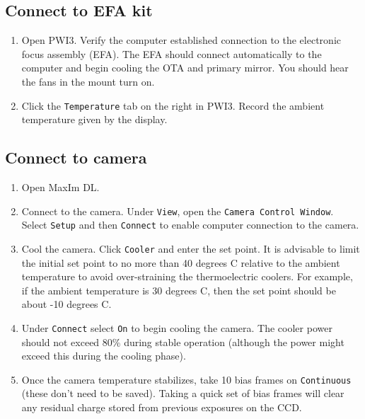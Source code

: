 \documentclass{article}
\begin{document}
	\subsection{Connect to EFA kit}
	\label{sec:connect-to-efa-kit}
	
	\begin{enumerate}
		
		\item Open PWI3. Verify the computer established connection to the electronic focus assembly (EFA). The EFA should connect automatically to the computer and begin cooling the OTA and primary mirror. You should hear the fans in the mount turn on.
		
		\item Click the \texttt{Temperature} tab on the right in PWI3. Record the ambient temperature given by the display.
		
	\end{enumerate}
	
	\subsection{Connect to camera}
	\label{sec:connect-to-camera}
	
	\begin{enumerate}
		
		\item Open MaxIm DL.
		
		\item Connect to the camera. Under \texttt{View}, open the \texttt{Camera Control Window}. Select \texttt{Setup} and then \texttt{Connect} to enable computer connection to the camera.
		
		\item Cool the camera. Click \texttt{Cooler} and enter the set point. It is advisable to limit the initial set point to no more than 40 degrees C relative to the ambient temperature to avoid over-straining the thermoelectric coolers. For example, if the ambient temperature is 30 degrees C, then the set point should be about -10 degrees C.
		
		\item Under \texttt{Connect} select \texttt{On} to begin cooling the camera. The cooler power should not exceed 80\% during stable operation (although the power might exceed this during the cooling phase).
		
		\item Once the camera temperature stabilizes, take 10 bias frames on \texttt{Continuous} (these don't need to be saved). Taking a quick set of bias frames will clear any residual charge stored from previous exposures on the CCD.
		
	\end{enumerate}
\end{document}

